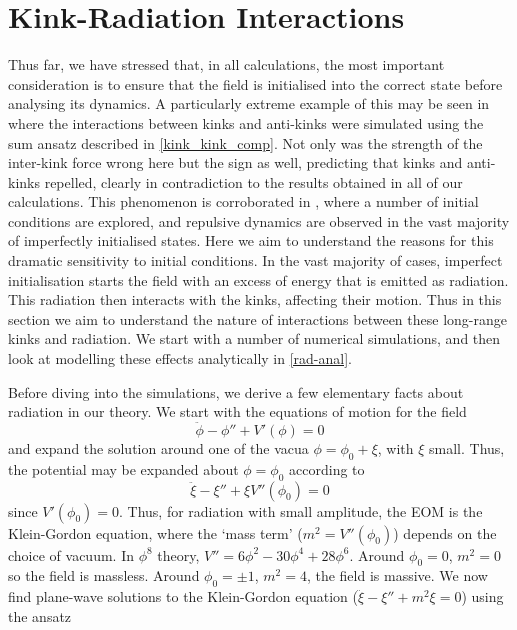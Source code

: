 \documentclass[11pt, oneside,titlepage]{article}  	%
\numberwithin{equation}{section}
\begin{document}
 \section{Kink-Radiation Interactions}\label{kink_radiation}
 Thus far, we have stressed that, in all calculations, the most important consideration is to ensure that the field is initialised into the correct state before analysing its dynamics. A particularly extreme example of this may be seen in \cite{belendryasova} where the interactions between kinks and anti-kinks were simulated using the sum ansatz described in \textsection \ref{kink_kink_comp}. Not only was the strength of the inter-kink force wrong here but the sign as well, predicting that kinks and anti-kinks repelled, clearly in contradiction to the results obtained in all of our calculations. This phenomenon is corroborated in \cite{christov-num}, where a number of initial conditions are explored, and repulsive dynamics are observed in the vast majority of imperfectly initialised states. Here we aim to understand the reasons for this dramatic sensitivity to initial conditions. In the vast majority of cases, imperfect initialisation starts the field with an excess of energy that is emitted as radiation. This radiation then interacts with the kinks, affecting their motion. Thus in this section we aim to understand the nature of interactions between these long-range kinks and radiation. We start with a number of numerical simulations, and then look at modelling these effects analytically in \textsection \ref{rad-anal}. \par
 Before diving into the simulations, we derive a few elementary facts about radiation in our theory. We start with the equations of motion for the field
 \begin{equation}
 \ddot{\phi} - \phi'' + V'(\phi) = 0
 \end{equation}
and expand the solution around one of the vacua $\phi = \phi_0 + \xi$, with $\xi$ small. Thus, the potential may be expanded about $\phi = \phi_0$ according to
\begin{equation}
\ddot{\xi} -\xi'' + \xi V''(\phi_0) = 0
\end{equation}
since $V'(\phi_0) = 0$. Thus, for radiation with small amplitude, the EOM is the Klein-Gordon equation, where the `mass term' ($m^2 = V''(\phi_0)$) depends on the choice of vacuum. In $\phi^8$ theory, $V'' = 6\phi^2 -30\phi^4 + 28\phi^6$. Around $\phi_0 = 0$, $m^2 = 0$ so the field is massless. Around $\phi_0 = \pm1$, $m^2 = 4$, the field is massive. We now find plane-wave solutions to the Klein-Gordon equation ($\ddot{\xi} - \xi'' + m^2\xi = 0$) using the ansatz
\end{document}
